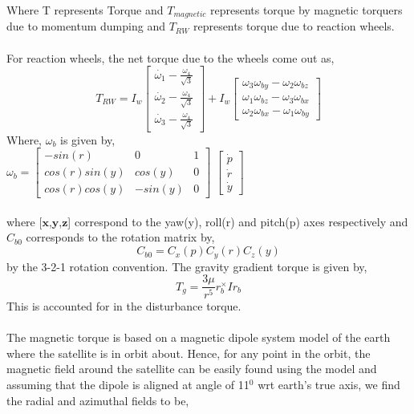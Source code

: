 \documentclass[10pt,a4paper]{report}
\begin{document}
Where T represents Torque and $ T_{magnetic} $ represents torque by magnetic torquers due to momentum dumping and $ T_{RW} $ represents torque due to reaction wheels.
\\
\\
For reaction wheels, the net torque due to the wheels come out as,
\begin{equation}
T_{RW}=I_{w}\begin{bmatrix}
\dot{\omega_{1}}-\frac{\omega_{4}}{\sqrt{3}}\\
\dot{\omega_{2}}-\frac{\omega_{4}}{\sqrt{3}}\\
\dot{\omega_{3}}-\frac{\omega_{4}}{\sqrt{3}}
\end{bmatrix}
+I_{w}\begin{bmatrix}
\omega_{3}\omega_{by}-\omega_{2}\omega_{bz}\\
\omega_{1}\omega_{bz}-\omega_{3}\omega_{bx}\\
\omega_{2}\omega_{bx}-\omega_{1}\omega_{by}
\end{bmatrix}
\end{equation}
Where, $ \omega_{b} $ is given by,\\
$
\omega_{b} =\begin{bmatrix}
-sin(r) & 0 & 1\\
cos(r) sin(y)&cos(y)&0\\
cos(r) cos(y)&-sin(y)&0
\end{bmatrix}
$ $
\begin{bmatrix}
\dot{p}\\ \dot{r} \\ \dot{y}
\end{bmatrix}
 $\\ \\
where [$\textbf{x}$,$\textbf{y}$,$\textbf{z}$]  correspond to the yaw(y), roll(r) and pitch(p) axes respectively and $ C_{b0} $ corresponds to the rotation matrix by,
\begin{equation}
C_{b0}=C_{x}(p)C_{y}(r)C_{z}(y)
\end{equation}
by the 3-2-1 rotation convention.
\newpage
The gravity gradient torque is given by,
\begin{equation}
T_{g}=\frac{3\mu}{r^{5}}r_{b}^{\times}Ir_{b}
\end{equation}
This is accounted for in the disturbance torque.
\\ \\The magnetic torque is based on a magnetic dipole system model of the earth where the satellite is in orbit about. Hence, for any point in the orbit, the magnetic field around the satellite can be easily found using the model and assuming that the dipole is aligned at angle of 11$ ^{0} $ wrt earth's true axis, we find the radial and azimuthal fields to be,
\end{document}
